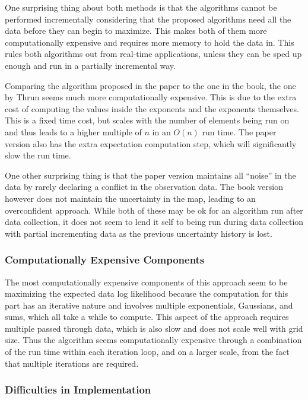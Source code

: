 \documentclass[10pt, titlepage, onecolumn, fleqn]{article}
\begin{document}
One surprising thing about both methods is that the algorithms cannot be performed incrementally considering that the proposed algorithms need all the data before they can begin to maximize. This makes both of them more computationally expensive and requires more memory to hold the data in. This rules both algorithms out from real-time applications, unless they can be sped up enough and run in a partially incremental way.

Comparing the algorithm proposed in the paper to the one in the book, the one by Thrun seems much more computationally expensive. This is due to the extra cost of computing the values inside the exponents and the exponents themselves. This is a fixed time cost, but scales with the number of elements being run on and thus leads to a higher multiple of $n$ in an $O(n)$ run time. The paper version also has the extra expectation computation step, which will significantly slow the run time.

One other surprising thing is that the paper version maintains all ``noise'' in the data by rarely declaring a conflict in the observation data. The book version however does not maintain the uncertainty in the map, leading to an overconfident approach. While both of these may be ok for an algorithm run after data collection, it does not seem to lend it self to being run during data collection with partial incrementing data as the previous uncertainty history is lost.

\subsubsection{Computationally Expensive Components}

The most computationally expensive components of this approach seem to be maximizing the expected data log likelihood because the computation for this part has an iterative nature and involves multiple exponentials, Gaussians, and sums, which all take a while to compute. This aspect of the approach requires multiple passed through data, which is also slow and does not scale well with grid size. Thus the algorithm seems computationally expensive through a combination of the run time within each iteration loop, and on a larger scale, from the fact that multiple iterations are required.

\subsubsection{Difficulties in Implementation}
\end{document}
